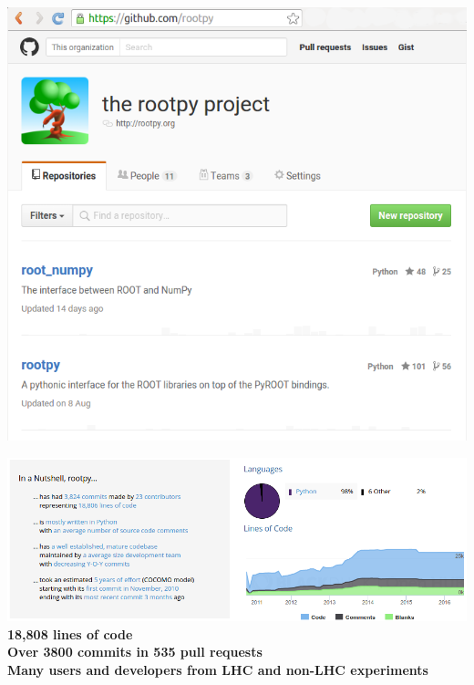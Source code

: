 \documentclass[10pt,professionalfonts,serif,usenames,dvipsnames,svgnames,table]{beamer}
\begin{document}
{

\begin{frame}[plain]
    \begin{center}
    \includegraphics[height=\textheight]{figs/rootpy-github.png}
    \end{center}
\end{frame}

\begin{frame}[plain]
    \begin{center}
    \includegraphics[width=\textwidth]{figs/rootpy-stats.png}\\
    
    \vspace{1cm}
    {\bf
    18,808 lines of code\\
    Over 3800 commits in 535 pull requests\\
    Many users and developers from LHC and non-LHC experiments}
    \end{center}
\end{frame}
}
\end{document}
